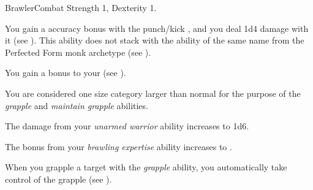   \begin{feat}{Brawler}{Combat}
    \featpre Strength 1, Dexterity 1.

     You gain a  accuracy bonus with the punch/kick , and you deal 1d4 damage with it (see ).
    This ability does not stack with the ability of the same name from the Perfected Form monk archetype (see ).

     You gain a  bonus to your  (see ).

     You are considered one size category larger than normal for the purpose of the \textit{grapple} and \textit{maintain grapple} abilities.

     The damage from your \textit{unarmed warrior} ability increases to 1d6.

     The bonus from your \textit{brawling expertise} ability increases to .

     When you grapple a target with the \textit{grapple} ability, you automatically take control of the grapple (see ).
  \end{feat}

